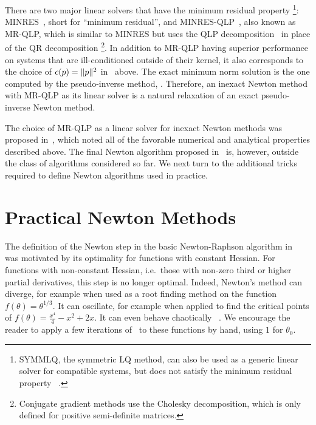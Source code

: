 \documentclass[../../thesis.tex]{subfiles}
\begin{document}
There are two major linear solvers
that have the minimum residual property%
\footnote{SYMMLQ, the symmetric LQ method,
can also be used as a generic linear solver
for compatible systems,
but does not satisfy the minimum residual property%
~\cite{paige1975}.}:
MINRES~\cite{paige1975},
short for \enquote{minimum residual},
and MINRES-QLP~\cite{choi2011},
also known as MR-QLP,
which is similar to MINRES but uses the
QLP decomposition~\cite{huckaby2005}
in place of the QR decomposition%
\footnote{Conjugate gradient methods use the
Cholesky decomposition,
which is only defined for positive semi-definite matrices.}.
In addition to MR-QLP having superior performance
on systems that are ill-conditioned outside of their kernel,
it also corresponds to the choice of $c(p) = \lVert p\rVert^2$
in~ above.
The exact minimum norm solution is the one computed by
the pseudo-inverse method,
.
Therefore, an inexact Newton method with MR-QLP
as its linear solver is a natural relaxation
of an exact pseudo-inverse Newton method.

The choice of MR-QLP as a linear solver
for inexact Newton methods
was proposed in~\cite{roosta2018},
which noted all of the favorable numerical
and analytical properties described above.
The final Newton algorithm proposed in~\cite{roosta2018}
is, however, outside the class of algorithms considered so far.
We next turn to the additional tricks required to
define Newton algorithms used in practice.

\section{Practical Newton Methods}

The definition of the Newton step in
the basic Newton-Raphson algorithm in~
was motivated by its optimality for functions with constant Hessian.
For functions with non-constant Hessian,
i.e.~those with non-zero third or higher partial derivatives,
this step is no longer optimal.
Indeed, Newton's method can diverge,
for example when used as a root finding method
on the function
$f(\theta) = \theta^{1/3}$.
It can oscillate, for example when applied to find the critical points of
$f(\theta) = \frac{x^4}{4} - x^2 + 2x$.
It can even behave chaotically%
~\cite{griewank1983}.
We encourage the reader to apply a few iterations
of~ to these functions by hand,
using $1$ for $\theta_0$.
\end{document}
